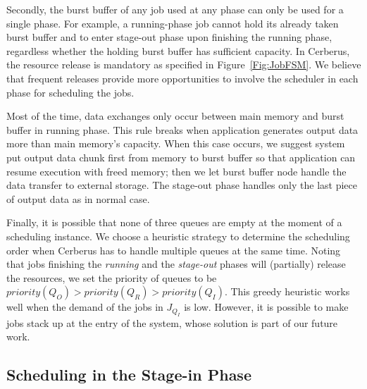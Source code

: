 Secondly, the burst buffer of any job used at any phase can only be used for a single phase.
For example, a running-phase job cannot hold its already taken burst buffer
and to enter stage-out phase upon finishing the running phase,
regardless whether the holding burst buffer has sufficient capacity.
In Cerberus, the resource release is mandatory as specified in Figure~\ref{Fig:JobFSM}.
We believe that frequent releases provide more opportunities to involve the scheduler in each phase for scheduling the jobs.

Most of the time, data exchanges only occur between main memory and burst buffer in running phase.
This rule breaks when application generates output data more than main memory's capacity.
When this case occurs, we suggest system put output data chunk first from memory to burst buffer
so that application can resume execution with freed memory;
then we let burst buffer node handle the data transfer to external storage.
The stage-out phase handles only the last piece of output data as in normal case.

Finally, it is possible that none of three queues are empty at the moment of a scheduling instance.
We choose a heuristic strategy to determine the scheduling order when
Cerberus has to handle multiple queues at the same time.
Noting that jobs finishing the \textit{running} and the \textit{stage-out} phases will
(partially) release the resources,
we set the priority of queues to be $priority(Q_O) > priority(Q_R) > priority(Q_I)$.
This greedy heuristic works well when the demand of the jobs in $J_{Q_I}$ is low.
However, it is possible to make jobs stack up at the entry of the system,
whose solution is part of our future work.


\subsection{Scheduling in the Stage-in Phase}
\label{SubSec:OptStageIn}

